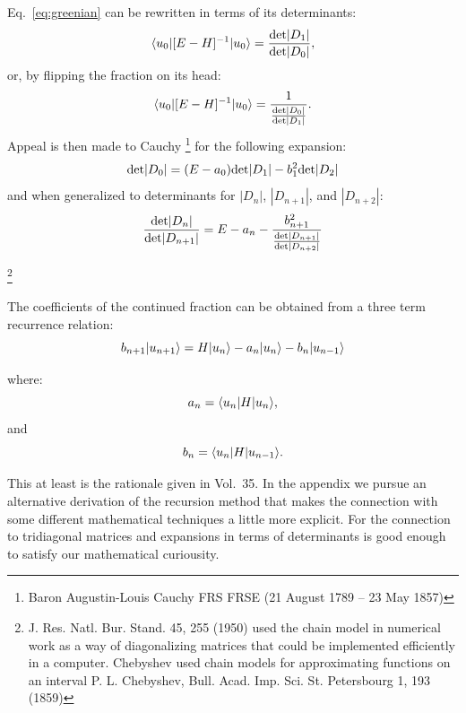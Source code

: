 Eq.~\ref{eq:greenian} can be rewritten in terms of its determinants:
%
\begin{equation}
\label{eq:greendet}
\langle u_{0}|[E-H]^{-1}|u_{0}\rangle = \frac{{\rm det}|D_{1}|}{{\rm det}|D_{0}|},
\end{equation}
%
or, by flipping the fraction on its head:
%
\begin{equation}
\label{eq:greendet}
\langle u_{0}|[E-H]^{-1}|u_{0}\rangle = \frac{1}{\frac{{\rm det}|D_{0}|}{{\rm det}|D_{1}|}}.
\end{equation}
%
Appeal is then made to Cauchy \footnote{Baron Augustin-Louis Cauchy FRS FRSE (21 August 1789 – 23 May 1857)} 
for the following expansion:
%
\begin{equation}
\label{eq:cauchy}
{\rm det}|D_{0}| = (E-a_{0}){\rm det}|D_{1}|-b^{2}_{1}{\rm det}|D_{2}|
\end{equation}
%
and when generalized to determinants for $|D_{n}|$, $|D_{n+1}|$, and $|D_{n+2}|$:
%
\begin{equation}
\frac{{\rm det}|D_{n}|}{{\rm det}|D_{n+1}|} = E-a_{n}-\frac{b^{2}_{n+1}}{\frac{{\rm det}|D_{n+1}|}{{\rm det}|D_{n+2}|}}
\end{equation}

\footnote{
 J. Res. Natl. Bur. Stand. 45, 255 (1950) 
used the chain model in numerical work as a way of diagonalizing matrices
that could be implemented efficiently in a computer.
Chebyshev used chain models for approximating functions on an interval
P. L. Chebyshev, Bull. Acad. Imp. Sci. St. Petersbourg 1, 193 (1859)}

The coefficients of the continued fraction can be obtained from
a three term recurrence relation:
%
\begin{equation}
b_{n+1}|u_{n+1}\rangle = H |u_{n}\rangle - a_{n}|u_{n}\rangle - b_{n}|u_{n-1}\rangle
\end{equation}

where:
\begin{equation}
a_{n} = \langle u_{n}|H|u_{n} \rangle,
\end{equation}
and 
\begin{equation}
b_{n} = \langle u_{n}|H|u_{n-1} \rangle.
\end{equation}

This at least is the rationale given in Vol.~35. In the appendix we pursue an
alternative derivation of the recursion method that makes the connection
with some different mathematical techniques a little more explicit. For the connection
to tridiagonal matrices and expansions in terms of determinants
is good enough to satisfy our mathematical curiousity.

